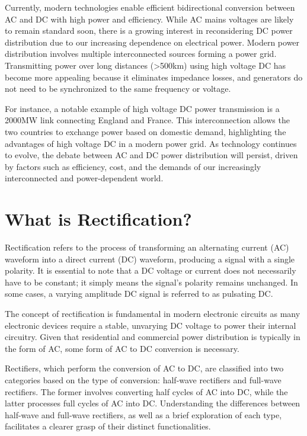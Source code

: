 \documentclass[12pt,a4paper]{book}
\begin{document}
Currently, modern technologies enable efficient bidirectional conversion between AC and DC with high power and efficiency. While AC mains voltages are likely to remain standard soon, there is a growing interest in reconsidering DC power distribution due to our increasing dependence on electrical power. Modern power distribution involves multiple interconnected sources forming a power grid. Transmitting power over long distances (>500km) using high voltage DC has become more appealing because it eliminates impedance losses, and generators do not need to be synchronized to the same frequency or voltage.

For instance, a notable example of high voltage DC power transmission is a 2000MW link connecting England and France. This interconnection allows the two countries to exchange power based on domestic demand, highlighting the advantages of high voltage DC in a modern power grid. As technology continues to evolve, the debate between AC and DC power distribution will persist, driven by factors such as efficiency, cost, and the demands of our increasingly interconnected and power-dependent world.

\chapter{What is Rectification?}
Rectification refers to the process of transforming an alternating current (AC) waveform into a direct current (DC) waveform, producing a signal with a single polarity. It is essential to note that a DC voltage or current does not necessarily have to be constant; it simply means the signal's polarity remains unchanged. In some cases, a varying amplitude DC signal is referred to as pulsating DC.

The concept of rectification is fundamental in modern electronic circuits as many electronic devices require a stable, unvarying DC voltage to power their internal circuitry. Given that residential and commercial power distribution is typically in the form of AC, some form of AC to DC conversion is necessary.

Rectifiers, which perform the conversion of AC to DC, are classified into two categories based on the type of conversion: half-wave rectifiers and full-wave rectifiers. The former involves converting half cycles of AC into DC, while the latter processes full cycles of AC into DC. Understanding the differences between half-wave and full-wave rectifiers, as well as a brief exploration of each type, facilitates a clearer grasp of their distinct functionalities.
\end{document}
